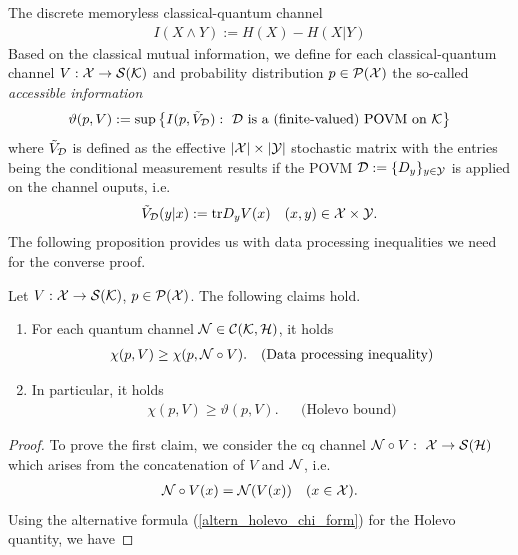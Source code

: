 \begin{section}{The discrete memoryless  classical-quantum channel}
	\begin{align}
	I(X \wedge Y) := H(X) - H(X|Y) \label{rule_class_transinformations}
	\end{align}
	Based on the classical mutual information, we define for each classical-quantum channel $V: {\mathcal X} \rightarrow {\mathcal S}({\mathcal K})$ and probability distribution $p \in {\mathcal P}({\mathcal X})$ the so-called \emph{accessible information} 
	\begin{align*}
	\vartheta(p,V) := \sup\left\{I(p, \tilde{V}_{\mathcal D}): \ {\mathcal D} \ \text{is a (finite-valued)} \ \text{POVM on} \ {\mathcal K} \right\}
	\end{align*}
	where $\tilde{V}_{{\mathcal D}}$ is defined as the effective $|{\mathcal X}| \times |{\mathcal Y}|$ stochastic matrix with the entries being the conditional measurement results if the POVM ${\mathcal D} :=  \{D_y\}_{y \in {\mathcal Y}}$ is applied on the channel ouputs, i.e. 
	\begin{align}
	\tilde{V}_{{\mathcal D}}(y|x) := \mathrm{tr} D_yV(x) &&(x,y) \in {\mathcal X} \times {\mathcal Y}. \label{channel_cod_effect_stoch_mat}
	\end{align}
	The following proposition provides us with data processing inequalities we need for the converse proof.
	\begin{proposition} \label{prop:holevo_bound}
		Let $V : {\mathcal X} \rightarrow {\mathcal S}({\mathcal K})$, $p \in {\mathcal P}({\mathcal X})$. The following claims hold.
		\begin{enumerate}
			\item For each quantum channel ${\mathcal N} \in {\mathcal C}({\mathcal K}, {\mathcal H})$, it holds \label{prop:holevo_bound_1}
			\begin{align*}
			\chi(p,V) \geq \chi(p, {\mathcal N} \circ V). &&\text{(Data processing inequality)}\label{holevo_dpi}
			\end{align*}
			\item In particular, it holds \label{prop:holevo_bound_2}
			\begin{align*} 
			\chi(p,V) \geq \vartheta(p,V). &&\text{(Holevo bound)}
			\end{align*}
		\end{enumerate}
	\end{proposition}
	\begin{proof}
		To prove the first claim, we consider the cq channel ${\mathcal N}\circ V: \ {\mathcal X} \rightarrow {\mathcal S}({\mathcal H})$ which arises from the concatenation of $V$ and ${\mathcal N}$, i.e. 
		\begin{align*}
		{\mathcal N}\circ V(x) = {\mathcal N}(V(x))  &&(x \in {\mathcal X}).
		\end{align*}
		Using the alternative formula (\ref{altern_holevo_chi_form}) for the Holevo quantity, we have

\end{proof}
\end{section}
